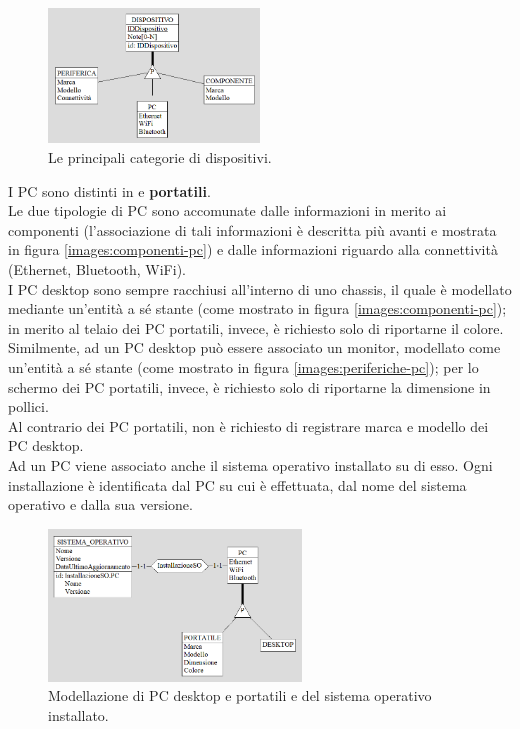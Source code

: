 \documentclass[a4paper,12pt]{report}
\begin{document}
\begin{figure}[H]
	\centering
	\includegraphics[width=0.5\textwidth]{images/dispositivo.png}
    \caption{Le principali categorie di dispositivi.}
	\label{images:dispositivo}
\end{figure}

\noindent I PC sono distinti in  e \textbf{portatili}. \\
Le due tipologie di PC sono accomunate dalle informazioni in merito ai componenti (l'associazione di tali informazioni è descritta più avanti e mostrata in figura \ref{images:componenti-pc}) e dalle informazioni riguardo alla connettività (Ethernet, Bluetooth, WiFi). \\
I PC desktop sono sempre racchiusi all'interno di uno chassis, il quale è modellato mediante un'entità a sé stante (come mostrato in figura \ref{images:componenti-pc}); in merito al telaio dei PC portatili, invece, è richiesto solo di riportarne il colore. \\
Similmente, ad un PC desktop può essere associato un monitor, modellato come un'entità a sé stante (come mostrato in figura \ref{images:periferiche-pc}); per lo schermo dei PC portatili, invece, è richiesto solo di riportarne la dimensione in pollici. \\
Al contrario dei PC portatili, non è richiesto di registrare marca e modello dei PC desktop. \\
Ad un PC viene associato anche il sistema operativo installato su di esso. Ogni installazione è identificata dal PC su cui è effettuata, dal nome del sistema operativo e dalla sua versione.

\begin{figure}[H]
	\centering
	\includegraphics[width=0.6\textwidth]{images/pc.png}
    \caption{Modellazione di PC desktop e portatili e del sistema operativo installato.}
	\label{images:pc}
\end{figure}
\end{document}
